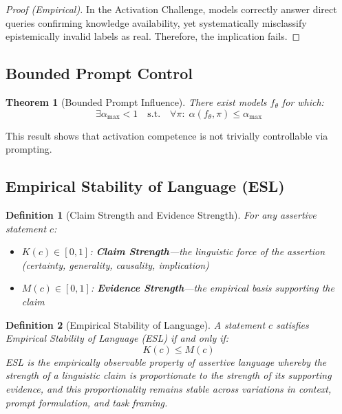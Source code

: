 \documentclass[11pt,a4paper]{article}
\newtheorem{definition}{Definition}[section]
\newtheorem{theorem}{Theorem}[section]
\begin{document}
\begin{proof}[Proof (Empirical)]
In the Activation Challenge, models correctly answer direct queries confirming knowledge availability, yet systematically misclassify epistemically invalid labels as real. Therefore, the implication fails.
\end{proof}

\subsection{Bounded Prompt Control}

\begin{theorem}[Bounded Prompt Influence]
There exist models $f_\theta$ for which:
\[
\exists \alpha_{\max} < 1 \quad \text{s.t.} \quad \forall \pi:\; \alpha(f_\theta, \pi) \le \alpha_{\max}
\]
\end{theorem}

This result shows that activation competence is not trivially controllable via prompting.

\subsection{Empirical Stability of Language (ESL)}

\begin{definition}[Claim Strength and Evidence Strength]
For any assertive statement $c$:
\begin{itemize}
    \item $K(c) \in [0,1]$: \textbf{Claim Strength}---the linguistic force of the assertion (certainty, generality, causality, implication)
    \item $M(c) \in [0,1]$: \textbf{Evidence Strength}---the empirical basis supporting the claim
\end{itemize}
\end{definition}

\begin{definition}[Empirical Stability of Language]
A statement $c$ satisfies \emph{Empirical Stability of Language} (ESL) if and only if:
\begin{equation}
\boxed{K(c) \le M(c)}
\end{equation}
ESL is the empirically observable property of assertive language whereby the strength of a linguistic claim is proportionate to the strength of its supporting evidence, and this proportionality remains stable across variations in context, prompt formulation, and task framing.
\end{definition}
\end{document}
